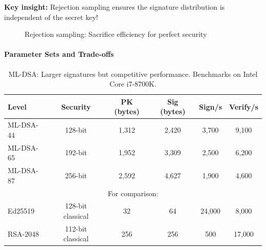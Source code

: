 \documentclass[11pt,a4paper]{article}
\begin{document}
\textbf{Key insight:} Rejection sampling ensures the signature distribution is independent of the secret key!

\begin{figure}[h]
\centering
{}
\caption{Rejection sampling: Sacrifice efficiency for perfect security}
\end{figure}

\paragraph{Parameter Sets and Trade-offs}

\begin{table}[h]
\centering
\begin{tabular}{|l|c|c|c|c|c|}
\hline
\textbf{Level} & \textbf{Security} & \textbf{PK (bytes)} & \textbf{Sig (bytes)} & \textbf{Sign/s} & \textbf{Verify/s} \\
\hline
ML-DSA-44 & 128-bit & 1,312 & 2,420 & 3,700 & 9,100 \\
ML-DSA-65 & 192-bit & 1,952 & 3,309 & 2,500 & 6,200 \\
ML-DSA-87 & 256-bit & 2,592 & 4,627 & 1,900 & 4,600 \\
\hline
\multicolumn{6}{c}{For comparison:} \\
\hline
Ed25519 & 128-bit classical & 32 & 64 & 24,000 & 8,000 \\
RSA-2048 & 112-bit classical & 256 & 256 & 500 & 17,000 \\
\hline
\end{tabular}
\caption{ML-DSA: Larger signatures but competitive performance. Benchmarks on Intel Core i7-8700K.}
\end{table}
\end{document}
